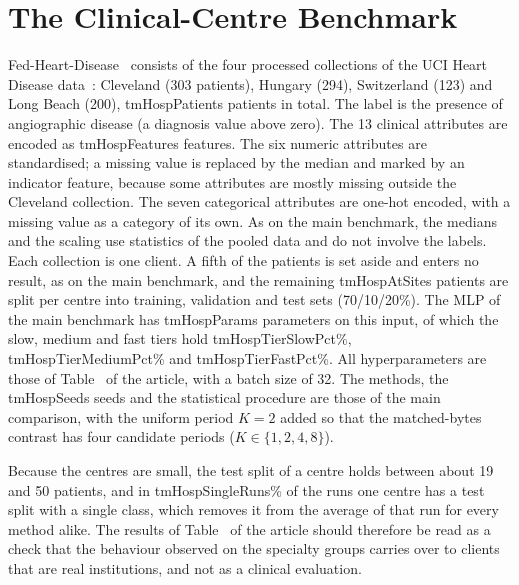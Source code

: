 \documentclass[journal]{IEEEtran}
\newcommand{\Gh}{\hat\Gamma}
\newcommand{\fit}[1]{\sbox\tabbox{#1}\ifdim\wd\tabbox>\linewidth\resizebox{\linewidth}{!}{\usebox\tabbox}\else\usebox\tabbox\fi}
\begin{document}
\begin{table}[t]
\caption{Dispersion $\Gh_g$ ($\times10^{-3}$) of the uploaded slices of the two shared tiers, averaged over the synchronisation rounds after warm-up, for uniform periods $K$ on the specialty groups (MLP) under the two synchronisation steps; $K=1$ is FedPer, for which the steps coincide}
\label{tab:dispersion}
\centering\small
\fit{\gen{tm_dispersion}}
\end{table}

\section{The Clinical-Centre Benchmark}
\label{supp:centres}
Fed-Heart-Disease~\cite{duterrail2022flamby} consists of the four processed collections of the UCI Heart Disease data~\cite{detrano1989}: Cleveland (303 patients), Hungary (294), Switzerland (123) and Long Beach (200), \num{tmHospPatients} patients in total. The label is the presence of angiographic disease (a diagnosis value above zero). The 13 clinical attributes are encoded as \num{tmHospFeatures} features. The six numeric attributes are standardised; a missing value is replaced by the median and marked by an indicator feature, because some attributes are mostly missing outside the Cleveland collection. The seven categorical attributes are one-hot encoded, with a missing value as a category of its own. As on the main benchmark, the medians and the scaling use statistics of the pooled data and do not involve the labels. Each collection is one client. A fifth of the patients is set aside and enters no result, as on the main benchmark, and the remaining \num{tmHospAtSites} patients are split per centre into training, validation and test sets (70/10/20\%). The MLP of the main benchmark has \num{tmHospParams} parameters on this input, of which the slow, medium and fast tiers hold \num{tmHospTierSlowPct}\%, \num{tmHospTierMediumPct}\% and \num{tmHospTierFastPct}\%. All hyperparameters are those of Table~ of the article, with a batch size of 32. The methods, the \num{tmHospSeeds} seeds and the statistical procedure are those of the main comparison, with the uniform period $K=2$ added so that the matched-bytes contrast has four candidate periods ($K\in\{1,2,4,8\}$).

Because the centres are small, the test split of a centre holds between about 19 and 50 patients, and in \num{tmHospSingleRuns}\% of the runs one centre has a test split with a single class, which removes it from the average of that run for every method alike. The results of Table~ of the article should therefore be read as a check that the behaviour observed on the specialty groups carries over to clients that are real institutions, and not as a clinical evaluation.
\end{document}
